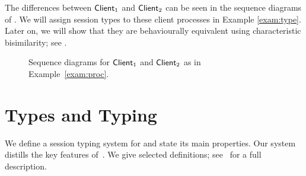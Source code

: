 \documentclass[a4paper,UKenglish]{lipics}
\theoremstyle{definition}
\begin{document}
\begin{example}
%
%
%

The differences between $\mathsf{Client}_1$ and $\mathsf{Client}_2$ can be  seen in the sequence diagrams of . 
We will assign session types to these client processes in Example \ref{exam:type}.
Later on, we will show that they are behaviourally equivalent using characteristic bisimilarity;
see .
\begin{figure}

\caption{Sequence diagrams for $\mathsf{Client}_1$ and $\mathsf{Client}_2$ as in Example~\ref{exam:proc}\label{fig:exam}.}
\end{figure}
\end{example}



\section{Types and Typing}
\label{sec:types}
\noi %
We define a session typing system for \HOp and state its main properties. 
Our system distills the key features of~\cite{tlca07,MostrousY15}.
We give selected definitions; 
see~\cite{KouzapasPY15} for a full description. 

\end{document}
